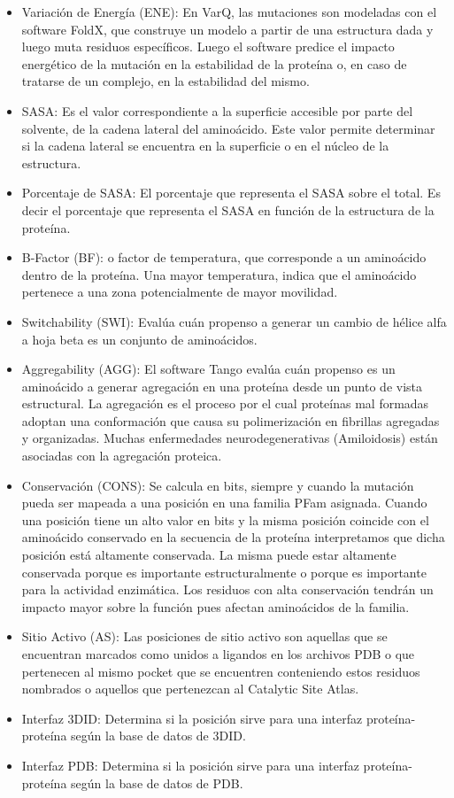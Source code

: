 \begin{itemize}
    \item Variación de Energía (ENE): En VarQ, las mutaciones son modeladas con el software FoldX, que construye un modelo a partir de una estructura dada y luego muta residuos específicos. Luego el software predice el impacto energético de la mutación en la estabilidad de la proteína o, en caso de tratarse de un complejo, en la estabilidad del mismo.
    \item SASA: Es el valor correspondiente a la superficie accesible por parte del solvente, de la cadena lateral del aminoácido. Este valor permite determinar si la cadena lateral se encuentra en la superficie o en el núcleo de la estructura.
    \item Porcentaje de SASA: El porcentaje que representa el SASA sobre el total. Es decir el porcentaje que representa el SASA en función de la estructura de la proteína.
    \item B-Factor (BF): o factor de temperatura, que corresponde a un aminoácido dentro de la proteína. Una mayor temperatura, indica que el aminoácido pertenece a una zona potencialmente de mayor movilidad.
    \item Switchability (SWI): Evalúa cuán propenso a generar un cambio de hélice alfa a hoja beta es un conjunto de aminoácidos.
    \item Aggregability (AGG): El software Tango evalúa cuán
    propenso es un aminoácido a generar agregación en una proteína desde un punto de vista estructural. La agregación es el proceso por el cual proteínas mal formadas
    adoptan una conformación que causa su polimerización en fibrillas agregadas y organizadas. Muchas enfermedades neurodegenerativas (Amiloidosis) están asociadas con la agregación proteica.
    \item Conservación (CONS): Se calcula en bits, siempre y cuando la mutación pueda ser mapeada a una posición en una familia PFam asignada. Cuando una posición tiene un alto valor en bits y la
    misma posición coincide con el aminoácido conservado en la secuencia de la proteína
    interpretamos que dicha posición está altamente conservada. La misma puede estar
    altamente conservada porque es importante estructuralmente o porque es importante para
    la actividad enzimática. Los residuos con alta conservación tendrán un impacto mayor sobre la función pues afectan aminoácidos de la familia.
    \item Sitio Activo (AS): Las posiciones de sitio activo son
    aquellas que se encuentran marcados como unidos a ligandos en los archivos PDB o que
    pertenecen al mismo pocket que se encuentren conteniendo estos residuos nombrados o
    aquellos que pertenezcan al Catalytic Site Atlas.
    \item Interfaz 3DID: Determina si la posición sirve para una interfaz proteína-proteína según la base de datos de 3DID.
    \item Interfaz PDB: Determina si la posición sirve para una interfaz proteína-proteína según la base de datos de PDB.
\end{itemize}



